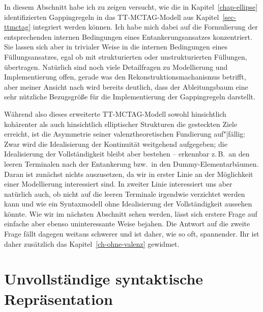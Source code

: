 In diesem Abschnitt habe ich zu zeigen versucht, wie die in Kapitel~\ref{chap-ellipse} identifizierten Gappingregeln in das TT-MCTAG-Modell aus Kapitel~\ref{sec-ttmctag} integriert werden können. Ich habe mich dabei auf die Formulierung der entsprechenden internen Bedingungen eines Entankerungsansatzes konzentriert. Sie lassen sich aber in trivialer Weise in die internen Bedingungen eines Füllungsansatzes, egal ob mit strukturierten oder unstrukturierten Füllungen, übertragen. Natürlich sind noch viele Detailfragen zu Modellierung und Implementierung offen, gerade was den Rekonstruktionsmachanismus betrifft, aber meiner Ansicht nach wird bereits deutlich, dass der Ableitungsbaum eine sehr nützliche Bezugsgrö\ss e für die Implementierung der Gappingregeln darstellt. 

Während also dieses erweiterte TT-MCTAG-Modell sowohl hinsichtlich kohärenter als auch hinsichtlich elliptischer Strukturen die gesteckten Ziele erreicht, ist die Asymmetrie seiner valenztheoretischen Fundierung auf"|fällig: Zwar wird die Idealisierung der Kontinuität weitgehend aufgegeben; die Idealisierung der Vollständigkeit bleibt aber bestehen -- erkennbar z.\,B.\ an den leeren Terminalen nach der Entankerung bzw.\ in den Dummy-Elementarbäumen. Daran ist zunächst nichts auszusetzen, da wir in erster Linie an der Möglichkeit einer Modellierung interessiert sind. In zweiter Linie interessiert uns aber natürlich auch, ob nicht auf die leeren Terminale irgendwie verzichtet werden kann und wie ein Syntaxmodell ohne Idealisierung der Vollständigkeit aussehen könnte. Wie wir im nächsten Abschnitt sehen werden, lässt sich erstere Frage auf einfache aber ebenso uninteressante Weise bejahen. Die Antwort auf die zweite Frage fällt dagegen weitaus schwerer und ist daher, wie so oft, spannender. Ihr ist daher zusätzlich das Kapitel~\ref{ch-ohne-valenz} gewidmet. 


\section{Unvollständige syntaktische Repräsentation}\label{sec-unvollständige-repräsentation}

